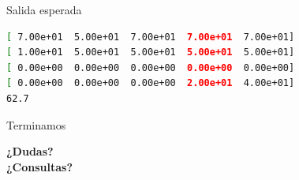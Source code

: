 \documentclass{beamer}
\begin{document}
\begin{frame}[fragile]{Salida esperada}
    \begin{lstlisting}[language=bash,backgroundcolor=\color{black},basicstyle=\color{white}\ttfamily,numbers=none]
[ 7.00e+01  5.00e+01  7.00e+01  7.00e+01  7.00e+01]
[ 1.00e+01  5.00e+01  5.00e+01  5.00e+01  5.00e+01]
[ 0.00e+00  0.00e+00  0.00e+00  0.00e+00  0.00e+00]
[ 0.00e+00  0.00e+00  0.00e+00  2.00e+01  4.00e+01]
62.7
    \end{lstlisting}
\end{frame}

\begin{frame}{Terminamos}
    \begin{center}
        \Large{\textbf{¿Dudas?\\¿Consultas?}}
    \end{center}
\end{frame}
\end{document}
